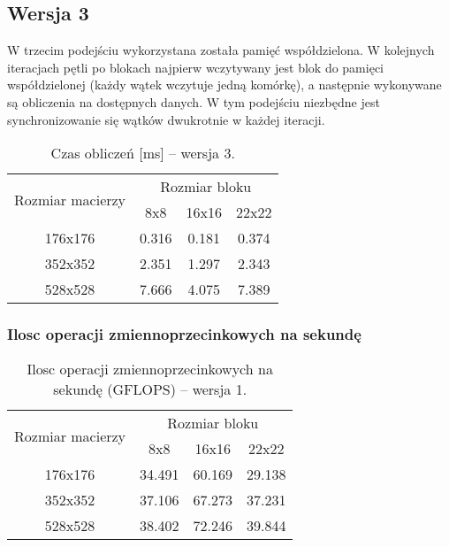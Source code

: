 
\subsection{Wersja 3}

W trzecim podejściu wykorzystana została pamięć współdzielona. W kolejnych iteracjach pętli po blokach najpierw wczytywany jest blok do pamięci współdzielonej (każdy wątek wczytuje jedną komórkę), a następnie wykonywane są obliczenia na dostępnych danych. W tym podejściu niezbędne jest synchronizowanie się wątków dwukrotnie w każdej iteracji.



\begin{table}[H]
\centering
\begin{tabular}{|c|c|c|c|}
\hline
\multirow{2}{*}{Rozmiar macierzy} & \multicolumn{3}{c|}{Rozmiar bloku} \\ \cline{2-4}
& 8x8 & 16x16 & 22x22 \\ \hline
176x176 & 0.316 & 0.181 & 0.374 \\ \hline
352x352 & 2.351 & 1.297 & 2.343 \\ \hline
528x528 & 7.666 & 4.075 & 7.389 \\ \hline
\end{tabular}
\caption{Czas obliczeń [ms] -- wersja 3.}
\end{table}

\subsubsection{Ilosc operacji zmiennoprzecinkowych na sekundę}

\begin{table}[H]
\centering
\begin{tabular}{|c|c|c|c|}
\hline
\multirow{2}{*}{Rozmiar macierzy} & \multicolumn{3}{c|}{Rozmiar bloku} \\ \cline{2-4}
& 8x8 & 16x16 & 22x22 \\ \hline
176x176 & 34.491 & 60.169 & 29.138 \\ \hline
352x352 & 37.106 & 67.273 & 37.231 \\ \hline
528x528 & 38.402 & 72.246 & 39.844 \\ \hline
\end{tabular}
\caption{Ilosc operacji zmiennoprzecinkowych na sekundę (GFLOPS) -- wersja 1.}
\end{table}

